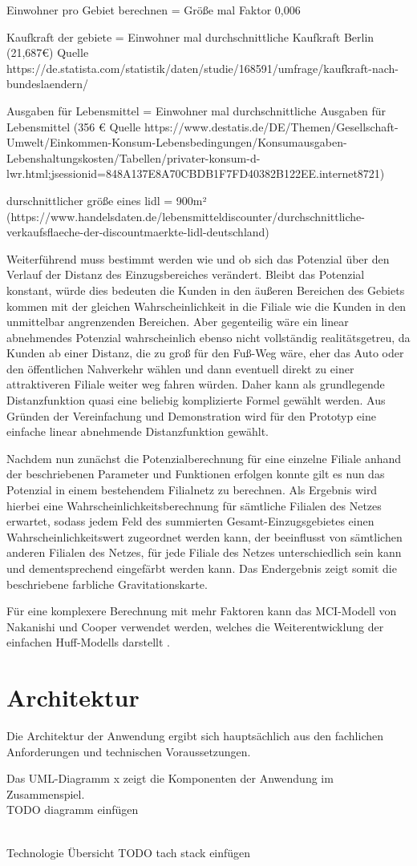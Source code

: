 Einwohner pro Gebiet berechnen = Größe mal Faktor 0,006

Kaufkraft der gebiete = Einwohner mal durchschnittliche Kaufkraft Berlin (21,687€) Quelle https://de.statista.com/statistik/daten/studie/168591/umfrage/kaufkraft-nach-bundeslaendern/

Ausgaben für Lebensmittel = Einwohner mal durchschnittliche Ausgaben für Lebensmittel (356 € Quelle https://www.destatis.de/DE/Themen/Gesellschaft-Umwelt/Einkommen-Konsum-Lebensbedingungen/Konsumausgaben-Lebenshaltungskosten/Tabellen/privater-konsum-d-lwr.html;jsessionid=848A137E8A70CBDB1F7FD40382B122EE.internet8721)

durschnittlicher größe eines lidl = 900m² (https://www.handelsdaten.de/lebensmitteldiscounter/durchschnittliche-verkaufsflaeche-der-discountmaerkte-lidl-deutschland)


Weiterführend muss bestimmt werden wie und ob sich das Potenzial über den Verlauf der Distanz des Einzugsbereiches verändert.
Bleibt das Potenzial konstant, würde dies bedeuten die Kunden in den äußeren Bereichen des Gebiets kommen mit der gleichen Wahrscheinlichkeit in die Filiale wie die Kunden in den unmittelbar angrenzenden Bereichen.
Aber gegenteilig wäre ein linear abnehmendes Potenzial wahrscheinlich ebenso nicht vollständig realitätsgetreu, da Kunden ab einer Distanz, die zu groß für den Fuß-Weg wäre, eher das Auto oder den öffentlichen Nahverkehr wählen und dann eventuell direkt zu einer attraktiveren Filiale weiter weg fahren würden. 
Daher kann als grundlegende Distanzfunktion quasi eine beliebig komplizierte Formel gewählt werden.
Aus Gründen der Vereinfachung und Demonstration wird für den Prototyp eine einfache linear abnehmende Distanzfunktion gewählt.

Nachdem nun zunächst die Potenzialberechnung für eine einzelne Filiale anhand der beschriebenen Parameter und Funktionen erfolgen konnte gilt es nun das Potenzial in einem bestehendem Filialnetz zu berechnen.
Als Ergebnis wird hierbei eine Wahrscheinlichkeitsberechnung für sämtliche Filialen des Netzes erwartet, sodass jedem Feld des summierten Gesamt-Einzugsgebietes einen Wahrscheinlichkeitswert zugeordnet werden kann, der beeinflusst von sämtlichen anderen Filialen des Netzes, für jede Filiale des Netzes unterschiedlich sein kann und dementsprechend eingefärbt werden kann.
Das Endergebnis zeigt somit die beschriebene farbliche Gravitationskarte.

Für eine komplexere Berechnung mit mehr Faktoren kann das MCI-Modell von Nakanishi und Cooper verwendet werden, welches die Weiterentwicklung der einfachen Huff-Modells darstellt \cite{mciModell}.

\section{Architektur}
Die Architektur der Anwendung ergibt sich hauptsächlich aus den fachlichen Anforderungen und technischen Voraussetzungen. 

Das UML-Diagramm x zeigt die Komponenten der Anwendung im Zusammenspiel.\\

TODO diagramm einfügen

\\

Technologie Übersicht
 TODO tach stack einfügen